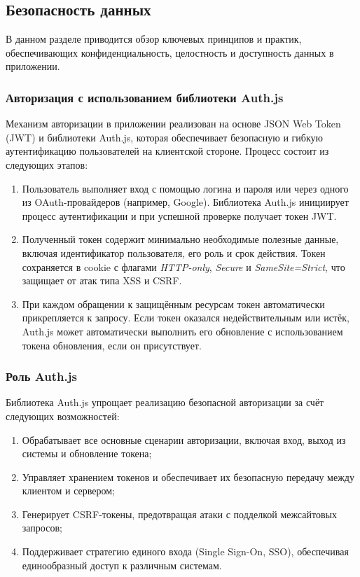\subsection{Безопасность данных}

В данном разделе приводится обзор ключевых принципов и практик, обеспечивающих конфиденциальность, целостность и доступность данных в приложении.

\subsubsection{Авторизация с использованием библиотеки Auth.js}
Механизм авторизации в приложении реализован на основе JSON Web Token (JWT) и библиотеки Auth.js, которая обеспечивает безопасную и гибкую аутентификацию пользователей на клиентской стороне. Процесс состоит из следующих этапов:

\begin{enumerate}
  \item Пользователь выполняет вход с помощью логина и пароля или через одного из OAuth-провайдеров (например, Google). Библиотека Auth.js инициирует процесс аутентификации и при успешной проверке получает токен JWT.
  \item Полученный токен содержит минимально необходимые полезные данные, включая идентификатор пользователя, его роль и срок действия. Токен сохраняется в cookie с флагами \textit{HTTP-only}, \textit{Secure} и \textit{SameSite=Strict}, что защищает от атак типа XSS и CSRF.
  \item При каждом обращении к защищённым ресурсам токен автоматически прикрепляется к запросу. Если токен оказался недействительным или истёк, Auth.js может автоматически выполнить его обновление с использованием токена обновления, если он присутствует.
\end{enumerate}

\subsubsection{Роль Auth.js}
Библиотека Auth.js упрощает реализацию безопасной авторизации за счёт следующих возможностей:

\begin{enumerate}
  \item Обрабатывает все основные сценарии авторизации, включая вход, выход из системы и обновление токена;
  \item Управляет хранением токенов и обеспечивает их безопасную передачу между клиентом и сервером;
  \item Генерирует CSRF-токены, предотвращая атаки с подделкой межсайтовых запросов;
  \item Поддерживает стратегию единого входа (Single Sign-On, SSO), обеспечивая единообразный доступ к различным системам.
\end{enumerate}

